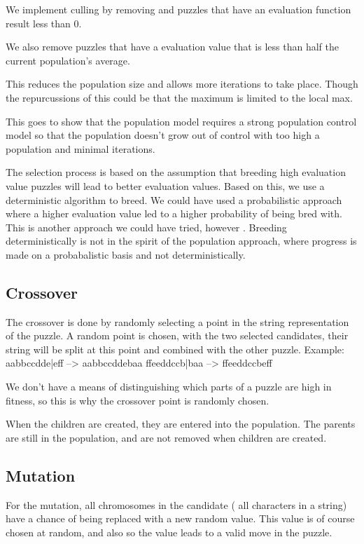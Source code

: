 \documentclass{report}
\begin{document}
We implement culling by removing and puzzles that have an evaluation function result less than 0. 

We also remove puzzles that have a evaluation value that is less than half the current population's average.

This reduces the population size and allows more iterations to take place. Though the repurcussions of this could be that the maximum is limited to the local max.

This goes to show that the population model requires a strong population control model so that the population doesn't grow out of control with too high a population and minimal iterations.

The selection process is based on the assumption that breeding high evaluation value puzzles will lead to better evaluation values. Based on this, we use a deterministic algorithm to breed. We could have used a probabilistic approach where a higher evaluation value led to a higher probability of being bred with. This is another approach we could have tried, however . Breeding deterministically is not in the spirit of the population approach, where progress is made on a probabalistic basis and not deterministically.


\subsection{Crossover}
The crossover is done by randomly selecting a point in the string representation of the puzzle. A random point is chosen, with the two selected candidates, their string will be split at this point and combined with the other puzzle. 
Example: 
aabbccdde|eff --> aabbccddebaa
ffeeddccb|baa --> ffeeddccbeff

We don't have a means of distinguishing which parts of a puzzle are high in fitness, so this is why the crossover point is randomly chosen.

When the children are created, they are entered into the population. The parents are still in the population, and are not removed when children are created.


\subsection{Mutation}
For the mutation, all chromosomes in the candidate ( all characters in a string) have a chance of being replaced with a new random value. This value is of course chosen at random, and also so the value leads to a valid move in the puzzle.
\end{document}
